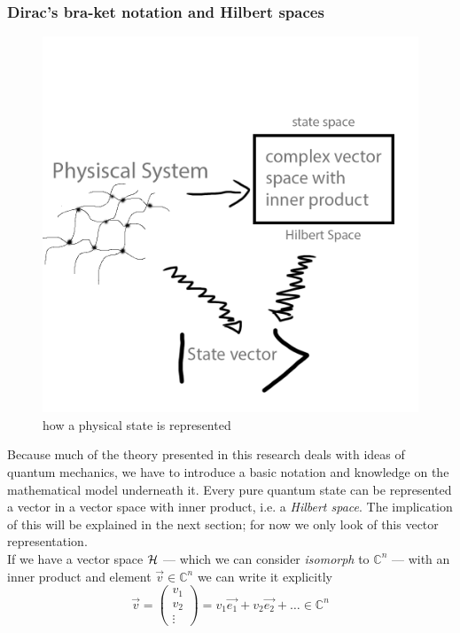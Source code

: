 	\subsubsection*{Dirac's bra-ket notation and Hilbert spaces}
	\begin{figure}[h!]
		\centering
		\includegraphics[scale=0.2]{images/sketch1.png} 
		\caption{how a physical state is represented}
	\end{figure}
	Because much of the theory presented in this research deals with ideas of quantum mechanics, we have to introduce a basic notation and knowledge on the mathematical model underneath it. 
	Every pure quantum state can be represented a vector in a vector space with inner product, i.e. a \emph{Hilbert space}. 
	The implication of this will be explained in the next section; for now we only look of this vector representation.\\
	 If we have a vector space $\mathcal{H}$ --- which we can consider \textit{isomorph} to $\mathbb{C}^n $ --- with an inner product and element $\vec{v}\in \mathbb{C}^n$ we can write it explicitly 
	$$ \vec{v} =  \begin{pmatrix} v_1 \\ v_2 \\ \vdots \end{pmatrix} = v_1\vec{e_1} + v_2\vec{e_2} + \ldots \in \mathbb{C}^n$$
